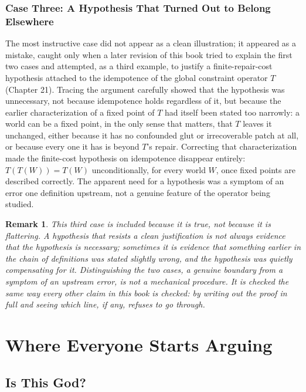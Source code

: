 \documentclass[11pt]{book}
\newtheorem{remark}[theorem]{Remark}
\begin{document}
\section*{Case Three: A Hypothesis That Turned Out to Belong Elsewhere}

The most instructive case did not appear as a clean illustration; it appeared as a mistake, caught only when a later revision of this book tried to explain the first two cases and attempted, as a third example, to justify a finite-repair-cost hypothesis attached to the idempotence of the global constraint operator $T$ (Chapter 21). Tracing the argument carefully showed that the hypothesis was unnecessary, not because idempotence holds regardless of it, but because the earlier characterization of a fixed point of $T$ had itself been stated too narrowly: a world can be a fixed point, in the only sense that matters, that $T$ leaves it unchanged, either because it has no confounded glut or irrecoverable patch at all, or because every one it has is beyond $T$'s repair. Correcting that characterization made the finite-cost hypothesis on idempotence disappear entirely: $T(T(W)) = T(W)$ unconditionally, for every world $W$, once fixed points are described correctly. The apparent need for a hypothesis was a symptom of an error one definition upstream, not a genuine feature of the operator being studied.

\begin{remark}
This third case is included because it is true, not because it is flattering. A hypothesis that resists a clean justification is not always evidence that the hypothesis is necessary; sometimes it is evidence that something earlier in the chain of definitions was stated slightly wrong, and the hypothesis was quietly compensating for it. Distinguishing the two cases, a genuine boundary from a symptom of an upstream error, is not a mechanical procedure. It is checked the same way every other claim in this book is checked: by writing out the proof in full and seeing which line, if any, refuses to go through.
\end{remark}

\part{Where Everyone Starts Arguing}

\chapter{Is This God?}
\end{document}
